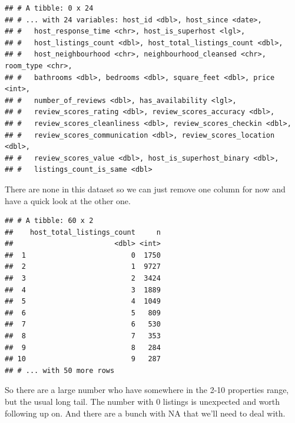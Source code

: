 \documentclass[
]{book}
\newenvironment{Shaded}{\begin{snugshade}}{\end{snugshade}}
\newcommand{\KeywordTok}[1]{\textcolor[rgb]{0.13,0.29,0.53}{\textbf{#1}}}
\newcommand{\NormalTok}[1]{#1}
\newcommand{\OperatorTok}[1]{\textcolor[rgb]{0.81,0.36,0.00}{\textbf{#1}}}
\newcommand{\StringTok}[1]{\textcolor[rgb]{0.31,0.60,0.02}{#1}}
\begin{document}
\begin{verbatim}
## # A tibble: 0 x 24
## # ... with 24 variables: host_id <dbl>, host_since <date>,
## #   host_response_time <chr>, host_is_superhost <lgl>,
## #   host_listings_count <dbl>, host_total_listings_count <dbl>,
## #   host_neighbourhood <chr>, neighbourhood_cleansed <chr>, room_type <chr>,
## #   bathrooms <dbl>, bedrooms <dbl>, square_feet <dbl>, price <int>,
## #   number_of_reviews <dbl>, has_availability <lgl>,
## #   review_scores_rating <dbl>, review_scores_accuracy <dbl>,
## #   review_scores_cleanliness <dbl>, review_scores_checkin <dbl>,
## #   review_scores_communication <dbl>, review_scores_location <dbl>,
## #   review_scores_value <dbl>, host_is_superhost_binary <dbl>,
## #   listings_count_is_same <dbl>
\end{verbatim}

There are none in this dataset so we can just remove one column for now and have a quick look at the other one.

\begin{Shaded}
\end{Shaded}

\begin{verbatim}
## # A tibble: 60 x 2
##    host_total_listings_count     n
##                        <dbl> <int>
##  1                         0  1750
##  2                         1  9727
##  3                         2  3424
##  4                         3  1889
##  5                         4  1049
##  6                         5   809
##  7                         6   530
##  8                         7   353
##  9                         8   284
## 10                         9   287
## # ... with 50 more rows
\end{verbatim}

So there are a large number who have somewhere in the 2-10 properties range, but the usual long tail. The number with 0 listings is unexpected and worth following up on. And there are a bunch with NA that we'll need to deal with.
\end{document}
